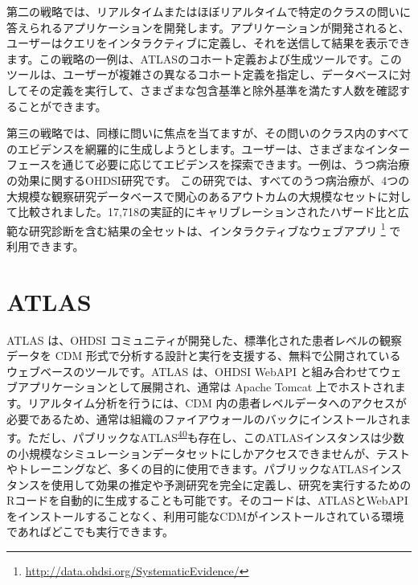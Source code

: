 \documentclass[
  11pt]{book}
\theoremstyle{definition}
\theoremstyle{definition}
\theoremstyle{definition}
\theoremstyle{definition}
\theoremstyle{remark}
\begin{document}
第二の戦略では、リアルタイムまたはほぼリアルタイムで特定のクラスの問いに答えられるアプリケーションを開発します。アプリケーションが開発されると、ユーザーはクエリをインタラクティブに定義し、それを送信して結果を表示できます。この戦略の一例は、ATLASのコホート定義および生成ツールです。このツールは、ユーザーが複雑さの異なるコホート定義を指定し、データベースに対してその定義を実行して、さまざまな包含基準と除外基準を満たす人数を確認することができます。

第三の戦略では、同様に問いに焦点を当てますが、その問いのクラス内のすべてのエビデンスを網羅的に生成しようとします。ユーザーは、さまざまなインターフェースを通じて必要に応じてエビデンスを探索できます。一例は、うつ病治療の効果に関するOHDSI研究です\citep{schuemie_2018b}。 この研究では、すべてのうつ病治療が、4つの大規模な観察研究データベースで関心のあるアウトカムの大規模なセットに対して比較されました。17,718の実証的にキャリブレーションされたハザード比と広範な研究診断を含む結果の全セットは、インタラクティブなウェブアプリ \footnote{\url{http://data.ohdsi.org/SystematicEvidence/}} で利用できます。

\section{ATLAS}\label{atlas}

ATLAS は、OHDSI コミュニティが開発した、標準化された患者レベルの観察データを CDM 形式で分析する設計と実行を支援する、無料で公開されているウェブベースのツールです。ATLAS は、OHDSI WebAPI と組み合わせてウェブアプリケーションとして展開され、通常は Apache Tomcat 上でホストされます。リアルタイム分析を行うには、CDM 内の患者レベルデータへのアクセスが必要であるため、通常は組織のファイアウォールのバックにインストールされます。ただし、パブリックなATLAS\textsuperscript{\href{https://ohdsi.github.io/TheBookOfOhdsi/OhdsiAnalyticsTools.html\#fn40}{40}}も存在し、このATLASインスタンスは少数の小規模なシミュレーションデータセットにしかアクセスできませんが、テストやトレーニングなど、多くの目的に使用できます。パブリックなATLASインスタンスを使用して効果の推定や予測研究を完全に定義し、研究を実行するためのRコードを自動的に生成することも可能です。そのコードは、ATLASとWebAPIをインストールすることなく、利用可能なCDMがインストールされている環境であればどこでも実行できます。
\end{document}
